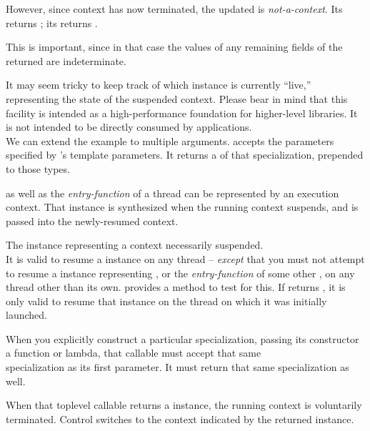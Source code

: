 However, since context  has now terminated, the updated 
is \emph{not-a-context}. Its  returns ;
its  returns .

This is important, since in that case the values of any remaining fields of
the returned  are indeterminate.

It may seem tricky to keep track of which \ectx instance is currently
``live,'' representing the state of the suspended context. Please bear in
mind that this facility is intended as a high-performance foundation for
higher-level libraries. It is not intended to be directly consumed by
applications.\\
\newpage
We can extend the example to multiple arguments.
\op accepts the parameters specified by \ectx's template parameters. It
returns a  of that \ectx specialization, prepended to those
types.


\main as well as the \emph{entry-function} of a thread can be represented by an
execution context. That \ectx instance is synthesized when the running context
suspends, and is passed into the newly-resumed context.


The \ectx instance representing a context necessarily suspended.\\
It is
valid to resume a \ectx instance on any thread -- \emph{except} that you must
not attempt to resume a \ectx instance representing \main, or
the \emph{entry-function} of some other , on any thread other
than its own.
\ectx provides a method to test for this.
If  returns , it is
only valid to resume that
\ectx instance on the thread on which it was initially launched.


When you explicitly construct a particular 
specialization, passing its constructor a function or lambda, that callable
must accept that same\\
 specialization as
its first parameter. It must return that
same  specialization as well.

When that toplevel callable returns a \ectx instance, the running context is
voluntarily terminated. Control switches to the context indicated by the
returned \ectx instance.

